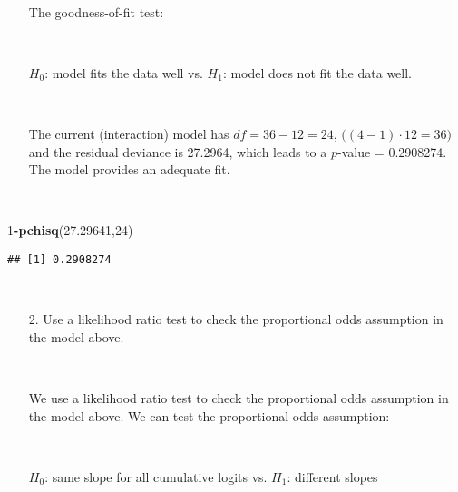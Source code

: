 \documentclass[]{article}
\newenvironment{Shaded}{\begin{snugshade}}{\end{snugshade}}
\newcommand{\KeywordTok}[1]{\textcolor[rgb]{0.13,0.29,0.53}{\textbf{#1}}}
\newcommand{\DecValTok}[1]{\textcolor[rgb]{0.00,0.00,0.81}{#1}}
\newcommand{\FloatTok}[1]{\textcolor[rgb]{0.00,0.00,0.81}{#1}}
\newcommand{\OperatorTok}[1]{\textcolor[rgb]{0.81,0.36,0.00}{\textbf{#1}}}
\newcommand{\NormalTok}[1]{#1}
\begin{document}
~

\begin{itemize}
\item[] The goodness-of-fit test:

\ 

\hfil $H_0$: model fits the data well \hspace{.15 cm} vs.  \hspace{.15 cm} $H_1$: model does not fit the data well.

\ 

The current (interaction) model has $df=36-12=24$, $\Big((4-1)\cdot 12 = 36\Big)$ and the residual deviance is 27.2964, which leads to a $p$-value = 0.2908274. The model provides an adequate fit.

\end{itemize}

~

\begin{Shaded}
\begin{Highlighting}[]
\DecValTok{1}\OperatorTok{-}\KeywordTok{pchisq}\NormalTok{(}\FloatTok{27.29641}\NormalTok{,}\DecValTok{24}\NormalTok{)}
\end{Highlighting}
\end{Shaded}

\begin{verbatim}
## [1] 0.2908274
\end{verbatim}

~

\begin{itemize}
\item[2.] Use a likelihood ratio test to check the proportional odds assumption in the model above.
\end{itemize}

~

\begin{itemize}
\item[] We use a likelihood ratio test to check the proportional odds assumption in the model above. We can test the proportional odds assumption:

\ 

\hfil $H_0$: same slope for all cumulative logits \hspace{.15 cm} vs.  \hspace{.15 cm} $H_1$: different slopes

\ 

\end{itemize}
\end{document}
